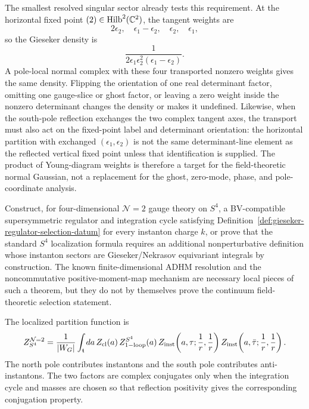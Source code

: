 \begin{controlledapproximation}
The smallest resolved singular sector already tests this requirement.  At the
horizontal fixed point \((2)\in{\rm Hilb}^2(\mathbb C^2)\), the tangent weights
are
\[
  2\epsilon_2,\quad
  \epsilon_1-\epsilon_2,\quad
  \epsilon_2,\quad
  \epsilon_1,
\]
so the Gieseker density is
\[
  \frac1{
  2\epsilon_1\epsilon_2^2(\epsilon_1-\epsilon_2)} .
\]
A pole-local normal complex with these four transported nonzero weights gives
the same density.  Flipping the orientation of one real determinant factor,
omitting one gauge-slice or ghost factor, or leaving a zero weight inside the
nonzero determinant changes the density or makes it undefined.  Likewise,
when the south-pole reflection exchanges the two complex tangent axes, the
transport must also act on the fixed-point label and determinant orientation:
the horizontal partition with exchanged \((\epsilon_1,\epsilon_2)\) is not the
same determinant-line element as the reflected vertical fixed point unless
that identification is supplied.  The product of Young-diagram weights is
therefore a target for the field-theoretic normal Gaussian, not a replacement
for the ghost, zero-mode, phase, and pole-coordinate analysis.
\end{controlledapproximation}

\begin{openproblem}
\label{op:susy-localization-gieseker-selection-theorem}
Construct, for four-dimensional \(\mathcal N=2\) gauge theory on \(S^4\), a
BV-compatible supersymmetric regulator and integration cycle satisfying
Definition~\ref{def:gieseker-regulator-selection-datum} for every instanton
charge \(k\), or prove that the standard \(S^4\) localization formula
requires an additional nonperturbative definition whose instanton sectors are
Gieseker/Nekrasov equivariant integrals by construction.  The known
finite-dimensional ADHM resolution and the noncommutative positive-moment-map
mechanism are necessary local pieces of such a theorem, but they do not by
themselves prove the continuum field-theoretic selection statement.
\end{openproblem}

The localized partition function is
\begin{equation}
  Z_{S^4}^{\mathcal N=2}
  =
  \frac1{|W_G|}
  \int_{\mathfrak t} da\,
  Z_{\rm cl}(a)\,
  Z_{1{\rm -loop}}^{S^4}(a)\,
  Z_{\rm inst}\!\left(a,\tau;\frac1r,\frac1r\right)
  Z_{\rm inst}\!\left(a,\bar\tau;\frac1r,\frac1r\right).
  \label{eq:pestun-s4-localization}
\end{equation}
The north pole contributes instantons and the south pole contributes
anti-instantons.  The two factors are complex conjugates only when the
integration cycle and masses are chosen so that reflection positivity gives
the corresponding conjugation property.

